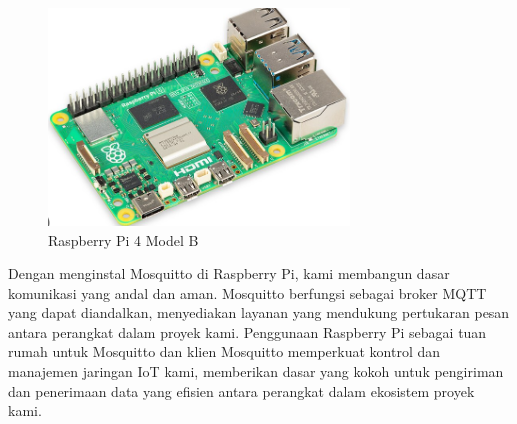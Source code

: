\begin{figure}[H]
    \centering
    \includegraphics[width=8cm]{image/rasberry-pi.png}
    \caption{Raspberry Pi 4 Model B}
    \label{fig:raspi}
\end{figure}


Dengan menginstal Mosquitto di Raspberry Pi, kami membangun dasar komunikasi yang andal dan aman. Mosquitto berfungsi sebagai broker MQTT yang dapat diandalkan, menyediakan layanan yang mendukung pertukaran pesan antara perangkat dalam proyek kami. Penggunaan Raspberry Pi sebagai tuan rumah untuk Mosquitto dan klien Mosquitto memperkuat kontrol dan manajemen jaringan IoT kami, memberikan dasar yang kokoh untuk pengiriman dan penerimaan data yang efisien antara perangkat dalam ekosistem proyek kami.

